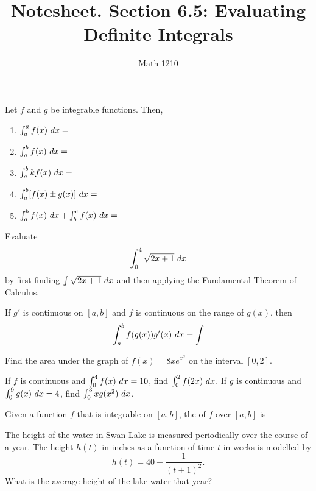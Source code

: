 \documentclass[12pt, a4paper]{article}
\author{Math 1210}
\title{Notesheet. Section 6.5: Evaluating Definite Integrals}
\date{}
\begin{document}
\maketitle
\nameline
\begin{thrm}
  Let \(f\) and \(g\) be integrable functions. Then,
  \begin{enumerate}
  \item \(\int_a^a f(x) \ d x = \)
  \item \(\int_a^b f(x) \ d x = \)
  \item \(\int_a^b k f(x) \ d x = \)
  \item \(\int_a^b [f(x) \pm g(x)] \ d x = \)
  \item \(\int_a^b f(x) \ d x + \int_b^c f(x) \ d x = \)
  \end{enumerate}
\end{thrm}
\begin{ex}
  Evaluate \[
    \int_0^4 \sqrt{2x+1} \ d x
  \]
  by first finding \(\int \sqrt{2x+1} \ d x\) and then applying the
  Fundamental Theorem of Calculus.
\end{ex}
\begin{thrm}
  If \(g'\) is continuous on \([a,b]\) and \(f\) is continuous on the
  range of \(g(x)\), then \[
    \int_a^b f(g(x))g'(x) \ d x = \int
  \]
\end{thrm}
\begin{ex}
  Find the area under the graph of \(f(x) = 8xe^{x^2}\) on the
  interval \([0,2]\).
\end{ex}
\begin{ex}
  If \(f\) is continuous and \(\int_0^4 f(x) \ d x = 10\), find
  \(\int_0^2 f(2x) \ d x\). If \(g\) is continuous and \(\int_0^9 g(x)
  \ d x = 4\), find \(\int_0^3 xg(x^2) \ d x\).
\end{ex}
\begin{thrm}
  Given a function \(f\) that is integrable on \([a,b]\), the
   of \(f\) over \([a,b]\) is
  \vspace{0.2in}
\end{thrm}
\begin{ex}
	The height of the water in Swan Lake is measured periodically over the course of a year.  The height $h(t)$ in inches as a function of time $t$ in weeks is modelled by
	$$ h(t) = 40 + \frac{1}{(t+1)^2}.$$
	What is the average height of the lake water that year?
\end{ex}
\end{document}
